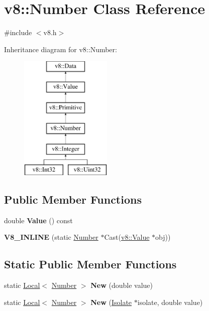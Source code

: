 \hypertarget{classv8_1_1_number}{}\section{v8\+:\+:Number Class Reference}
\label{classv8_1_1_number}


{\ttfamily \#include $<$v8.\+h$>$}

Inheritance diagram for v8\+:\+:Number\+:\begin{figure}[H]
\begin{center}
\leavevmode
\includegraphics[height=6.000000cm]{classv8_1_1_number}
\end{center}
\end{figure}
\subsection*{Public Member Functions}
\begin{DoxyCompactItemize}
\item 
\hypertarget{classv8_1_1_number_ae7ca1af5dd34a7a32a69f57a910ab269}{}double {\bfseries Value} () const \label{classv8_1_1_number_ae7ca1af5dd34a7a32a69f57a910ab269}

\item 
\hypertarget{classv8_1_1_number_a686da7d346857e08b605c293ad79600d}{}{\bfseries V8\+\_\+\+I\+N\+L\+I\+N\+E} (static \hyperlink{classv8_1_1_number}{Number} $\ast$Cast(\hyperlink{classv8_1_1_value}{v8\+::\+Value} $\ast$obj))\label{classv8_1_1_number_a686da7d346857e08b605c293ad79600d}

\end{DoxyCompactItemize}
\subsection*{Static Public Member Functions}
\begin{DoxyCompactItemize}
\item 
\hypertarget{classv8_1_1_number_aca00a12725ca6fefb326b7e00f3d252c}{}static \hyperlink{classv8_1_1_local}{Local}$<$ \hyperlink{classv8_1_1_number}{Number} $>$ {\bfseries New} (double value)\label{classv8_1_1_number_aca00a12725ca6fefb326b7e00f3d252c}

\item 
\hypertarget{classv8_1_1_number_a90ea55018560648ffaf8861372b41928}{}static \hyperlink{classv8_1_1_local}{Local}$<$ \hyperlink{classv8_1_1_number}{Number} $>$ {\bfseries New} (\hyperlink{classv8_1_1_isolate}{Isolate} $\ast$isolate, double value)\label{classv8_1_1_number_a90ea55018560648ffaf8861372b41928}

\end{DoxyCompactItemize}


